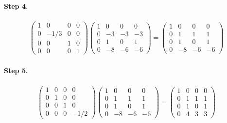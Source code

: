 \documentclass[11pt]{article}
\begin{document}
\paragraph{Step 4.}
\begin{eqnarray*}
\begin{pmatrix}
	1 & 0 & 0 & 0\\
	0 & -1/3 & 0 & 0\\
	0 & 0 & 1 & 0\\
	0 & 0 & 0 & 1
\end{pmatrix}
\left(\begin{array}{ccc|c}  
	1 & 0 & 0 & 0\\
    0 & -3 & -3 & -3\\
    0 & 1 & 0 & 1\\
    0 & -8 & -6 & -6
\end{array}\right)
=
\left(\begin{array}{ccc|c}  
	1 & 0 & 0 & 0\\
    0 & 1 & 1 & 1\\
    0 & 1 & 0 & 1\\
    0 & -8 & -6 & -6
\end{array}\right)
\end{eqnarray*}

\paragraph{Step 5.}
\begin{eqnarray*}
\begin{pmatrix}
	1 & 0 & 0 & 0\\
	0 & 1 & 0 & 0\\
	0 & 0 & 1 & 0\\
	0 & 0 & 0 & -1/2
\end{pmatrix}
\left(\begin{array}{ccc|c}  
	1 & 0 & 0 & 0\\
    0 & 1 & 1 & 1\\
    0 & 1 & 0 & 1\\
    0 & -8 & -6 & -6
\end{array}\right)
=
\left(\begin{array}{ccc|c}  
	1 & 0 & 0 & 0\\
    0 & 1 & 1 & 1\\
    0 & 1 & 0 & 1\\
    0 & 4 & 3 & 3
\end{array}\right)
\end{eqnarray*}
\end{document}
